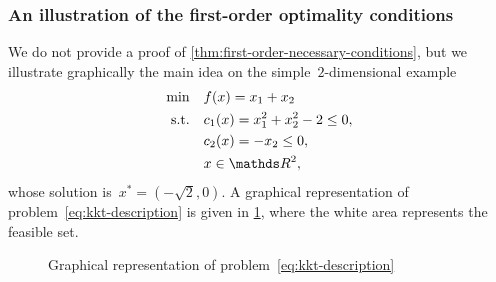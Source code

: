 \subsubsection{An illustration of the first-order optimality conditions}

We do not provide a proof of \cref{thm:first-order-necessary-conditions}, but we illustrate graphically the main idea on the simple~$2$-dimensional example
\begin{subequations}
    \label{eq:kkt-description}
    \begin{align}
        \min        & \quad \obj(x) = x_1 + x_2\\
        \text{s.t.} & \quad \con{1}(x) = x_1^2 + x_2^2 - 2 \le 0, \label{eq:kkt-description-c1}\\
                    & \quad \con{2}(x) = -x_2 \le 0, \label{eq:kkt-description-c2}\\
                    & \quad x \in \R^2, \nonumber
    \end{align}
\end{subequations}
whose solution is~$x^{\ast} = (-\sqrt{2}, 0)$.
A graphical representation of problem~\cref{eq:kkt-description} is given in \cref{fig:kkt-description}, where the white area represents the feasible set.

\begin{figure}[ht]
    \centering
    \caption{Graphical representation of problem~\cref{eq:kkt-description}}
    \label{fig:kkt-description}
\end{figure}

